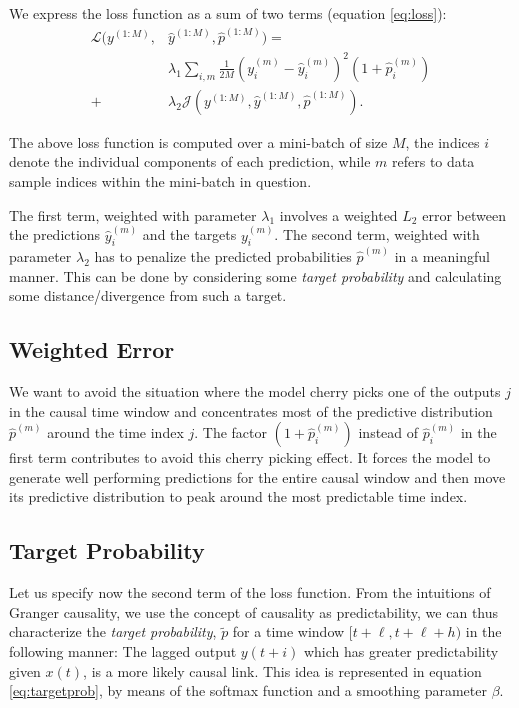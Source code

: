 \documentclass[twoside]{article}
\begin{document}
We express the loss function as a sum of two terms (equation \ref{eq:loss}):
\begin{equation}\label{eq:loss}
\begin{aligned}
\mathcal{L}(y^{(1:M)}, &\hat{y}^{(1:M)}, \hat{p}^{(1:M)}) =\\ 
&\lambda_1 \sum_{i,m}{\frac{1}{2M} (y^{(m)}_{i} - \hat{y}^{(m)}_{i})^2 (1 + \hat{p}^{(m)}_i)} \\ 
+ &\lambda_2 \mathcal{J}(y^{(1:M)}, \hat{y}^{(1:M)}, \hat{p}^{(1:M)}).
\end{aligned}
\end{equation}

The above loss function is computed over a mini-batch of size $M$, the indices $i$ denote the
individual components of each prediction, while $m$ refers to data sample indices within the
mini-batch in question.

The first term, weighted with parameter $\lambda_1$ involves a weighted $L_2$ 
error between the predictions $\hat{y}^{(m)}_{i}$ and the targets $y^{(m)}_{i}$. The second term, weighted with parameter $\lambda_2$
has to penalize the predicted probabilities $\hat{p}^{(m)}$ in a meaningful manner. This can be done by considering some \emph{target probability} and
calculating some distance/divergence from such a target.

\subsection{Weighted Error}

We want to avoid the situation where the model cherry picks one of the outputs $j$ in the causal time window
and concentrates most of the predictive distribution $\hat p^{(m)}$ around the time index $j$. 
The factor $(1+\hat p_i^{(m)})$ instead of $\hat p_i^{(m)}$ in the first term contributes 
to avoid this cherry picking effect. It forces the model to generate well performing
predictions for the entire causal window and then move its predictive distribution
to peak around the most predictable time index.

\subsection{Target Probability}

Let us specify now the second term of the loss function.
From the intuitions of Granger causality, we use the concept of causality as predictability, we can thus characterize 
the \emph{target probability}, $\widetilde{p}$ for a time window $[t+\ell, t+\ell+h)$ in the following manner: 
The lagged output $y(t+i)$ which has greater predictability given $x(t)$, is a more likely causal link. This idea is represented
in equation \ref{eq:targetprob}, by means of the softmax function and a smoothing parameter $\beta$.
\end{document}
